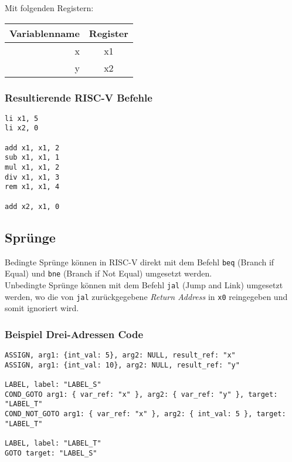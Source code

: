 Mit folgenden Registern:

\begin{table}[H]
	\begin{center}
		\begin{tabular}{| r | c |}
			\hline
			Variablenname & Register \\
			\hline
			x & x1 \\
			y & x2 \\
			\hline
		\end{tabular}
	\end{center}
\end{table}

\subsubsection{Resultierende RISC-V Befehle}

\begin{lstlisting}
li x1, 5
li x2, 0

add x1, x1, 2
sub x1, x1, 1
mul x1, x1, 2
div x1, x1, 3
rem x1, x1, 4

add x2, x1, 0
\end{lstlisting}

\subsection{Sprünge}

Bedingte Sprünge können in RISC-V direkt mit dem Befehl \texttt{beq} (Branch if Equal) und \texttt{bne} (Branch if Not Equal) umgesetzt werden.\\
Unbedingte Sprünge können mit dem Befehl \texttt{jal} (Jump and Link) umgesetzt werden, wo die von \texttt{jal} zurückgegebene \textit{Return Address} in \texttt{x0} reingegeben und somit ignoriert wird.

\subsubsection{Beispiel Drei-Adressen Code}

\begin{lstlisting}
ASSIGN, arg1: {int_val: 5}, arg2: NULL, result_ref: "x"
ASSIGN, arg1: {int_val: 10}, arg2: NULL, result_ref: "y"

LABEL, label: "LABEL_S"
COND_GOTO arg1: { var_ref: "x" }, arg2: { var_ref: "y" }, target: "LABEL_T"
COND_NOT_GOTO arg1: { var_ref: "x" }, arg2: { int_val: 5 }, target: "LABEL_T"

LABEL, label: "LABEL_T"
GOTO target: "LABEL_S"
\end{lstlisting}

